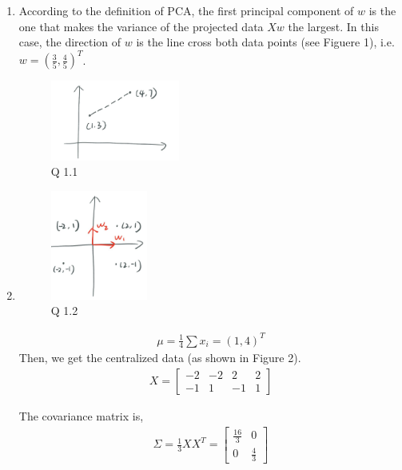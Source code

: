 \documentclass[12pt]{article}
\begin{document}
\begin{enumerate}

\item According to the definition of PCA, the first principal component of $w$ is the one that makes the variance of the projected data $Xw$ the largest. In this case, the direction of $w$ is the line cross both data points (see Figuere 1), i.e. $w = (\frac{3}{5} ,  \frac{4}{5})^T $.
\begin{figure}[H]
    \centering
    \includegraphics[width=0.4\textwidth]{../img/q1-1.jpg}
    \caption{Q 1.1}
\end{figure}

\item \begin{figure}[H]
    \centering
    \includegraphics[width=0.3\textwidth]{../img/q1-2.jpg}
    \caption{Q 1.2}
\end{figure}
\begin{align}
    \mu = \frac{1}{4} \sum x_i = (1, 4)^T \nonumber
\end{align}
Then, we get the centralized data (as shown in Figure 2).
\begin{align}
    X = \begin{bmatrix}
        -2 & -2 & 2 & 2 \\
        -1 & 1 & -1 & 1
    \end{bmatrix} \nonumber
\end{align}

The covariance matrix is, 
\begin{align}
    \Sigma = \frac{1}{3} X X^T = \begin{bmatrix}
        \frac{16}{3} & 0  \\
        0 & \frac{4}{3}
    \end{bmatrix} \nonumber
\end{align}


\end{enumerate}
\end{document}
